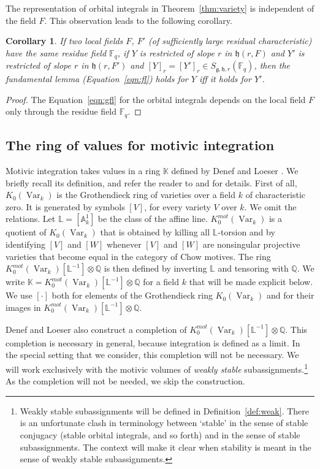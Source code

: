 \documentclass[11pt]{amsart}
\newtheorem{corollary}[theorem]{Corollary}
\theoremstyle{definition}
\theoremstyle{remark}
\numberwithin{equation}{theorem}
\def\f{{\mathbb{F}_q}}
\newcommand{\ring}[1]{\mathbb{#1}}
\def\op#1{\operatorname{#1}}
\def\lie#1{{\mathfrak{#1}}}
\def\liegood#1{{\lie#1}}
\def\mot{{K_0^{mot}(\op{Var}_k)[\ring{L}^{-1}]\otimes\ring{Q}}}
\begin{document}
The representation of orbital integrals in
Theorem~\ref{thm:variety} is independent of the field $F$.  This
observation leads to the following corollary.

\begin{corollary} \label{cor:F}
If two local fields $F$, $F'$ (of sufficiently large residual
characteristic) have the same residue field $\f$, if $Y$ is
restricted  of slope $r$ in $\liegood{h}(r,F)$ and $Y'$ is
restricted of slope $r$ in $\liegood{h}(r,F')$ and
$[Y]_r=[Y']_r\in S_{\lie{g},\lie{h},r}(\f)$, then the fundamental
lemma (Equation~\ref{eqn:fl}) holds for $Y$ iff it holds for $Y'$.
\end{corollary}

\begin{proof}  The Equation~\ref{eqn:gfl} for the orbital
integrals depends on the local field $F$ only through the residue
field $\f$.
\end{proof}


\subsection{The ring of values for motivic integration}

Motivic integration takes values in a ring $\ring{K}$ defined by
Denef and Loeser \cite{ICM}. We briefly recall its definition, and
refer the reader to \cite{ICM} and \cite{Rat} for details.  First
of all, $K_0(\op{Var}_k)$ is the Grothendieck ring of varieties
over a field $k$ of characteristic zero.  It is generated by
symbols $[V]$, for every variety $V$ over $k$.  We omit the
relations. Let $\ring{L}=[\ring{A}^1_k]$ be the class of the
affine line. $K_0^{mot}(\op{Var}_k)$ is a quotient of
$K_0(\op{Var}_k)$ that is obtained by killing all
$\ring{L}$-torsion and by identifying $[V]$ and $[W]$ whenever
$[V]$ and $[W]$ are nonsingular projective varieties that become
equal in the category of Chow motives.  The ring $\mot$ is then
defined by inverting $\ring{L}$ and tensoring with $\ring{Q}$.  We
write $\ring{K}=\mot$ for a field $k$ that will be made explicit
below. We use $[\cdot]$ both for elements of the Grothendieck ring
$K_0(\op{Var}_k)$ and for their images in $\mot$.

Denef and Loeser also construct a completion of $\mot$.     This
completion is necessary in general, because integration is defined
as a limit. In the special setting that we consider, this
completion will not be necessary.  We will work exclusively with
the motivic volumes of {\it weakly stable}
subassignments.\footnote{Weakly stable subassignments will be
defined in Definition~\ref{def:weak}. There is an unfortunate
clash in terminology between `stable' in the sense of stable
conjugacy (stable orbital integrals, and so forth) and in the
sense of stable subassignments.  The context will make it clear
when stability is meant in the sense of weakly stable
subassignments.} As the completion will not be needed, we skip the
construction.
\end{document}
